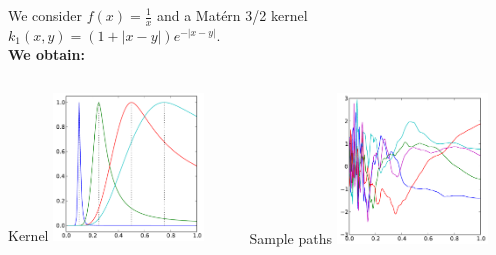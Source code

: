 \begin{frame}{}
\begin{example}
We consider $f(x) = \frac1x$ and a Mat\'ern 3/2 kernel $k_1(x,y) = (1 + |x-y|) e^{-|x-y|}$.\\ \vspace{5mm}
\textbf{We obtain:}
\begin{columns}[c]
\begin{column}{5cm}
\begin{center}
Kernel
\includegraphics[width=4cm]{3_gaussian_process_regression/figures/python/newfromold-compfunc-k}
\end{center}
\end{column}
\begin{column}{5cm}
\begin{center}
Sample paths
\includegraphics[width=4cm]{3_gaussian_process_regression/figures/python/newfromold-compfunc-traj}
\end{center}
\end{column}
\end{columns}
\end{example}
\end{frame}

